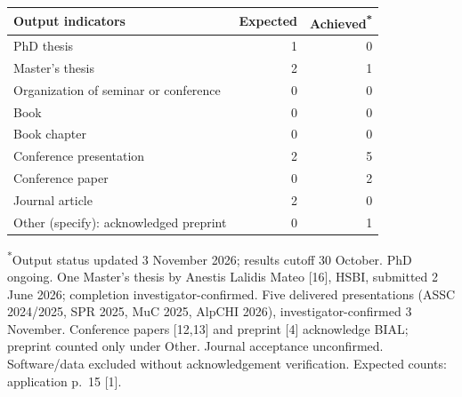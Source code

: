 \begingroup
\small\setlength{\tabcolsep}{4pt}\renewcommand{\arraystretch}{1.05}
\begin{tabular}{p{.51\linewidth}r r}
\toprule
Output indicators & Expected & Achieved\textsuperscript{*} \\
\midrule
PhD thesis & 1 & 0 \\
Master's thesis & 2 & 1 \\
Organization of seminar or conference & 0 & 0 \\
Book & 0 & 0 \\
Book chapter & 0 & 0 \\
Conference presentation & 2 & 5 \\
Conference paper & 0 & 2 \\
Journal article & 2 & 0 \\
Other (specify): acknowledged preprint & 0 & 1 \\
\bottomrule
\end{tabular}
\par\endgroup
\textsuperscript{*}Output status updated 3 November 2026; results cutoff 30 October. PhD ongoing. One Master's thesis by Anestis Lalidis Mateo [16], HSBI, submitted 2 June 2026; completion investigator-confirmed. Five delivered presentations (ASSC 2024/2025, SPR 2025, MuC 2025, AlpCHI 2026), investigator-confirmed 3 November. Conference papers [12,13] and preprint [4] acknowledge BIAL; preprint counted only under Other. Journal acceptance unconfirmed. Software/data excluded without acknowledgement verification. Expected counts: application p.~15 [1].
